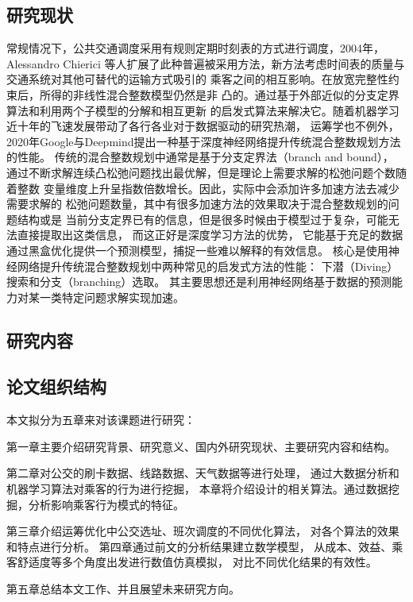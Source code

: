 \subsection{研究现状}
常规情况下，公共交通调度采用有规则定期时刻表的方式进行调度，2004年，Alessandro Chierici
等人扩展了此种普遍被采用方法\cite{c1}，新方法考虑时间表的质量与交通系统对其他可替代的运输方式吸引的
乘客之间的相互影响。在放宽完整性约束后，所得的非线性混合整数模型仍然是非
凸的。通过基于外部近似的分支定界算法和利用两个子模型的分解和相互更新
的启发式算法来解决它。随着机器学习近十年的飞速发展带动了各行各业对于数据驱动的研究热潮，
运筹学也不例外，2020年Google与Deepmind提出一种基于深度神经网络提升传统混合整数规划方法的性能\cite{nair2021solving}。
传统的混合整数规划中通常是基于分支定界法（branch and bound），
通过不断求解连续凸松弛问题找出最优解，但是理论上需要求解的松弛问题个数随着整数
变量维度上升呈指数倍数增长。因此，实际中会添加许多加速方法去减少需要求解的
松弛问题数量，其中有很多加速方法的效果取决于混合整数规划的问题结构或是
当前分支定界已有的信息，但是很多时候由于模型过于复杂，可能无法直接提取出这类信息，
而这正好是深度学习方法的优势，
它能基于充足的数据通过黑盒优化提供一个预测模型，捕捉一些难以解释的有效信息。
核心是使用神经网络提升传统混合整数规划中两种常见的启发式方法的性能：
下潜（Diving）搜索和分支（branching）选取。
其主要思想还是利用神经网络基于数据的预测能力对某一类特定问题求解实现加速。

\subsection{研究内容}

\subsection{论文组织结构}
本文拟分为五章来对该课题进行研究：

第一章主要介绍研究背景、研究意义、国内外研究现状、主要研究内容和结构。

第二章对公交的刷卡数据、线路数据、天气数据等进行处理，
通过大数据分析和机器学习算法对乘客的行为进行挖掘，
本章将介绍设计的相关算法。通过数据挖掘，分析影响乘客行为模式的特征。

第三章介绍运筹优化中公交选址、班次调度的不同优化算法，
对各个算法的效果和特点进行分析。
第四章通过前文的分析结果建立数学模型，
从成本、效益、乘客舒适度等多个角度出发进行数值仿真模拟，
对比不同优化结果的有效性。

第五章总结本文工作、并且展望未来研究方向。